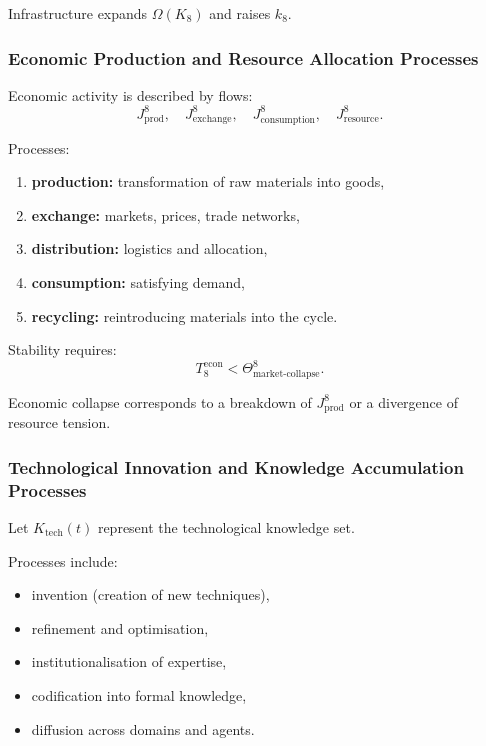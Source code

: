 Infrastructure expands $\Omega(K_8)$ and raises $k_8$.

\subsubsection{Economic Production and Resource Allocation Processes}

Economic activity is described by flows:
\[
J^8_{\text{prod}},\quad J^8_{\text{exchange}},\quad 
J^8_{\text{consumption}},\quad J^8_{\text{resource}}.
\]

Processes:
\begin{enumerate}
    \item \textbf{production:} transformation of raw materials into goods,
    \item \textbf{exchange:} markets, prices, trade networks,
    \item \textbf{distribution:} logistics and allocation,
    \item \textbf{consumption:} satisfying demand,
    \item \textbf{recycling:} reintroducing materials into the cycle.
\end{enumerate}

Stability requires:
\[
T_8^{\text{econ}} < \Theta^8_{\text{market-collapse}}.
\]

Economic collapse corresponds to a breakdown of $J^8_{\text{prod}}$ or 
a divergence of resource tension.

\subsubsection{Technological Innovation and Knowledge Accumulation Processes}

Let $K_{\text{tech}}(t)$ represent the technological knowledge set.

Processes include:
\begin{itemize}
    \item invention (creation of new techniques),
    \item refinement and optimisation,
    \item institutionalisation of expertise,
    \item codification into formal knowledge,
    \item diffusion across domains and agents.
\end{itemize}

